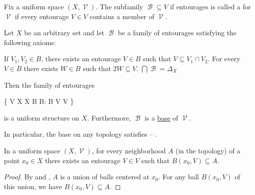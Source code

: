 \begin{definition}\label{def:uniform_space_base}
  Fix a uniform space \( (X, \mscrV) \). The subfamily \( \mscrB \subseteq V \) if entourages is called a  for \( \mscrV \) if every entourage \( V \in V \) contains a member of \( \mscrV \).
\end{definition}

\begin{definition}\label{thm:uniform_space_base_axioms}
  Let \( X \) be an arbitrary set and let \( \mscrB \) be a family of entourages satisfying the following axioms:
  \begin{thmenum}
     If \( V_1, V_2 \in B \), there exists an entourage \( V \in B \) such that \( V \subseteq V_1 \cap V_2 \).
     For every \( V \in B \) there exists \( W \in B \) such that \( 2W \subseteq V \).
     \( \bigcap \mscrB = \Delta_X \)
  \end{thmenum}

  Then the family of entourages
  \begin{balign}\label{thm:uniform_space_base_axioms/uniformity}
    \mscrV \coloneqq \left\{ V \subseteq X \times X \colon \exists B \in B: B \in V  V  \right\}
  \end{balign}
  is a uniform structure on \( X \). Furthermore, \( \mscrB \) is a \hyperref[def:uniform_space_base]{base} of \( \mscrV \).

  In particular, the base on any topology satisfies  -- .
\end{definition}

\begin{lemma}\label{thm:uniform_space_neighborhood_contains_ball}
  In a uniform space \( (X, \mscrV) \), for every neighborhood \( A \) (in the topology) of a point \( x_0 \in X \) there exists an entourage \( V \in V \) such that \( B(x_0, V) \subseteq A \).
\end{lemma}
\begin{proof}
  By  and , \( A \) is a union of balls centered at \( x_0 \). For any ball \( B(x_0, V) \) of this union, we have \( B(x_0, V) \subseteq A \).
\end{proof}

